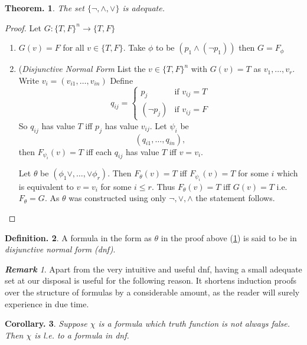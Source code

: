 \documentclass[a4paper,oneside,11pt,DIV=12,parskip=half]{scrartcl}
\theoremstyle{plain}
\newtheorem{theorem}{Theorem.}[section]
\newtheorem{corollary}[theorem]{Corollary.}
\theoremstyle{definition}
\newtheorem{definition}[theorem]{Definition.}
\newtheorem{remark, definition}[theorem]{Remark and Definition.}
\newtheorem{lemma, definition}[theorem]{Lemma and Definition.}
\newtheorem{theorem, definition}[theorem]{Theorem and Definition.}
\theoremstyle{remark}
\newtheorem*{remark}{\textbf{Remark}}
\newtheorem*{remark, example}{\textbf{Remark and Exercise}}
\begin{document}
\begin{theorem}\label{Th:connectives}
The set $\{ \lnot, \land, \lor\}$ is adequate. 
\end{theorem}

\begin{proof}
Let $G: \{T,F\}^n \rightarrow \{T,F\}$
\begin{enumerate}
\item $G(v) = F$ for all $v \in \{T,F\}$.
Take $\phi$ to be $(p_1 \land(\lnot p_1))$ then $ G = F_{\phi}$
\item (\emph{Disjunctive Normal Form}
List the $v \in \{ T,F \}^n$ with $G(v) = T$ as $v_1, \dots, v_r$.
Write $v_i = (v_{i1},\dots,v_{in})$
Define
\[ q_{ij} = \begin{cases} p_j &\text{if } v_{ij} = T \\  ( \lnot p_j) &\text{if } v_{ij} = F
\end{cases}\]
So $q_{ij}$ has value $T$ iff $p_j$ has value $v_{ij}$.
Let $\psi_i$ be
	\[ (q_{i1}, \dots, q_{in}), \]
then $F_{\psi_i}(v) = T$ iff each $q_{ij}$ has value $T$ iff $v = v_i$.

Let $\theta$ be $(\phi_1 \lor, \dots , \lor \phi_r)$.
Then $F_{\theta}(v) = T$ iff $F_{\psi_i}(v) = T$ for some $i$ which is equivalent to $v = v_i$ for some $i \leq r$.
Thus $F_{\theta} (v) = T$ iff $G(v) = T$ i.e. $F_{\theta} = G$.
As $\theta$ was constructed using only $\lnot,\lor,\land$ the statement follows.
\end{enumerate}

\end{proof}

\begin{definition}
A formula in the form as $\theta$ in the proof above (\ref{Th:connectives}) is said to be in \emph{disjunctive normal form (dnf)}.
\end{definition}

\begin{remark}

Apart from the very intuitive and useful dnf, having a small adequate set at our disposal is useful for the following reason. It shortens induction proofs over the structure of formulas by a considerable amount, as the reader will surely experience in due time.

\end{remark}

\begin{corollary} Suppose $\chi$ is a formula which truth function is not always false. Then $\chi$ is l.e. to a formula in dnf.
\end{corollary}
\end{document}

